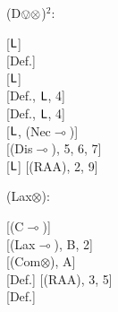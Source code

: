 \documentclass[a4paper,english,fleqn,11pt,final]{scrartcl}
\newcommand{\negg}{{\sim}}
\newcommand{\sfL}{\protect\ensuremath{\mathsf{L}}}
\newcommand{\limp}{\multimap}
\newcommand{\timp}{\rightarrowtriangle}
\newcommand{\tens}{\otimes}
\newcommand{\Deriv}[1]{{\normalfont\textsf{#1}}}
\newcommand{\oland}{\owedge}
\theoremstyle{plain}
\theoremstyle{definition}
\newcommand{\thm}{\text{\scriptsize\; (thm)}}
\begin{document}
{\begin{minipage}[t][][b]{.46\textwidth}
\Deriv{(D$\ovee\tens$)$^2$}:

\medskip

{
\setlength{\fitchprfwidth}{1.63in}
\fitchprf{
\pline[A ]{\varphi \tens (\psi \ovee \vartheta)}
}
{
	\pline[1 ]{\varphi \tens \negg(\negg\psi \oland \negg \vartheta)}[$\sfL$]\\
	\pline[2 ]{\negg (\varphi \limp \negg \negg(\negg \psi \oland \negg\vartheta))}[Def.]\\
	\subproof{\pline[3 ]{\negg ((\varphi \tens \psi) \ovee (\varphi \tens \vartheta))}}
	{
		\pline[4 ]{\negg(\varphi \tens \psi) \oland \negg(\varphi \tens \vartheta)}[$\sfL$]\\
		\pline[5 ]{\varphi \limp \negg \psi}[Def., $\sfL$, 4]\\
		\pline[6 ]{\varphi \limp \negg \vartheta}[Def., $\sfL$, 4]\\
		\pline[7 ]{\hspace{-6pt}\brokenform{\varphi \limp \big(\negg\psi \timp (\negg\vartheta}
		{\formula{\timp \negg(\psi \ovee \vartheta))\big) \thm}} }[$\sfL$, \Deriv{(Nec$\limp$)}]\\
		\pline[8 ]{\varphi \limp \negg(\psi \ovee \vartheta)}[\Deriv{(Dis$\limp$)}, 5, 6, 7]\\
		\pline[9 ]{\varphi \limp \negg\negg(\negg\psi \oland \negg \vartheta)}[$\sfL$]
	}
	\pline[\slider]{(\varphi \tens \psi) \ovee (\varphi \tens \vartheta))}[\Deriv{(RAA)}, 2, 9]
}
}
\end{minipage}

\bigskip



\begin{minipage}[t][][b]{.43\textwidth}

\Deriv{(Lax$\tens$)}:

\medskip

{
\setlength{\fitchprfwidth}{1.15in}
\fitchprf{
\pline[A ]{\varphi \tens \psi}\\
\pline[B ]{\vartheta}
}
{
\subproof{\pline[1 ]{\varphi \limp \negg\vartheta}}
{
	\pline[2 ]{\vartheta \limp \negg \varphi}[\Deriv{(C$\limp$)}]\\
	\pline[3 ]{\psi \limp \negg \varphi}[\Deriv{(Lax$\limp$)}, B, 2]\\
	\pline[4 ]{\psi \tens \varphi}[\Deriv{(Com$\tens$)}, A]\\
	\pline[5 ]{\negg(\psi \limp \negg \varphi)}[Def.]
}
	\pline[4 ]{\negg(\varphi \limp \negg\vartheta)}[\Deriv{(RAA)}, 3, 5]\\
	\pline[\slider]{\varphi \tens \vartheta}[Def.]
}
}
\end{minipage}
\begin{minipage}[t][][b]{.46\textwidth}


\end{minipage}}
\end{document}
